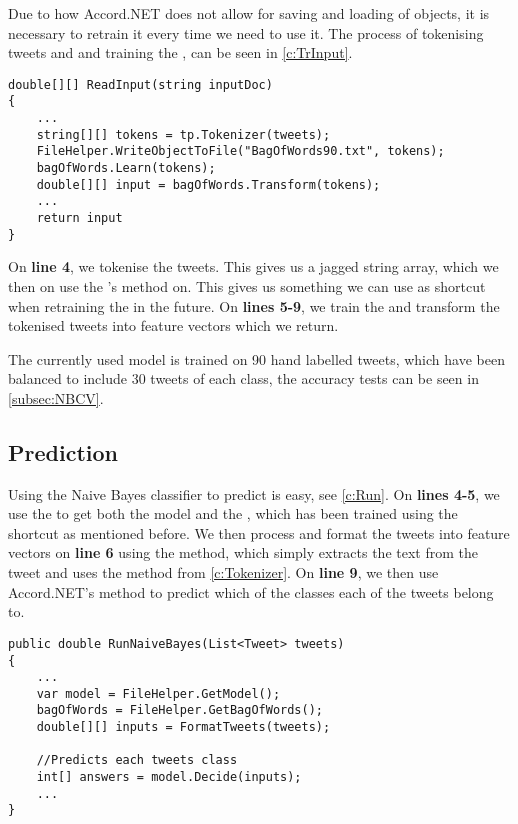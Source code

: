 Due to how Accord.NET does not allow for saving and loading of
 objects, it is necessary to retrain it every time we need to
use it. The process of tokenising tweets and and training the
, can be seen in \autoref{c:TrInput}.\nl

\begin{minipage}[H]{\linewidth}
\begin{lstlisting}[caption = Create and train the bag of words., label =
c:TrInput] 
double[][] ReadInput(string inputDoc)
{
    ...
    string[][] tokens = tp.Tokenizer(tweets);
    FileHelper.WriteObjectToFile("BagOfWords90.txt", tokens);
    bagOfWords.Learn(tokens);
    double[][] input = bagOfWords.Transform(tokens);
    ...
	return input
}
\end{lstlisting}
\end{minipage}

On \textbf{line 4}, we tokenise the tweets. This gives us a jagged string array,
which we then on  use the 's
 method on.
This gives us something we can use as shortcut when retraining the
 in the future. On \textbf{lines 5-9}, we train the
 and transform the tokenised tweets into feature vectors
which we return.\nl

The currently used model is trained on 90 hand labelled tweets, which have been
balanced to include 30 tweets of each class, the accuracy tests can be seen in
\autoref{subsec:NBCV}.

\subsection{Prediction}
Using the Naive Bayes classifier to predict is easy, see \autoref{c:Run}. On
\textbf{lines 4-5}, we use the  to get both the model and
the , which has been trained using the shortcut as
mentioned before. We then process and format the tweets into feature vectors on
\textbf{line 6} using the  method, which simply extracts the
text from the tweet and uses the  method from
\autoref{c:Tokenizer}. On \textbf{line 9}, we then use Accord.NET's
 method to predict which of the classes each of the tweets belong
to.\nl

\begin{minipage}[H]{\linewidth}
\begin{lstlisting}[caption = Load the Naive Bayes model and find
bias., label = c:Run] 
public double RunNaiveBayes(List<Tweet> tweets)
{
    ...
    var model = FileHelper.GetModel();
    bagOfWords = FileHelper.GetBagOfWords();
    double[][] inputs = FormatTweets(tweets);

    //Predicts each tweets class
    int[] answers = model.Decide(inputs);
    ...
}
\end{lstlisting}
\end{minipage}


